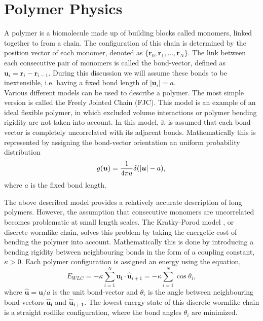 \section{Polymer Physics}
A polymer is a biomolecule made up of building blocks called monomers, linked together to
from a chain. The configuration of this chain is determined by the position vector of
each monomer, denoted as $\{\boldsymbol{r}_0, \boldsymbol{r}_1, \dots,
\boldsymbol{r}_N\}$.  The link between each consecutive pair of monomers is called the
bond-vector, defined as
$\boldsymbol{u}_i = \boldsymbol{r}_i - \boldsymbol{r}_{i-1}$. During this discussion we
will assume these bonds to be inextensible, i.e. having a fixed
bond length of $|\boldsymbol{u}_i| = a$.\\

Various different models can be used to describe a polymer. The most simple version is
called
the Freely Jointed Chain (FJC). This model is an example of an ideal flexible polymer, in
which excluded volume interactions or polymer bending rigidity are not taken into
account.  In this
model, it is assumed that each bond-vector is completely uncorrelated with its adjacent
bonds. Mathematically this is represented by assigning the bond-vector orientation
an uniform probability distribution
\begin{equation}
    g(\boldsymbol{u}) = \frac{1}{4 \pi a}
    \delta(|\boldsymbol{u}| - a), \\
\end{equation}
where $a$ is the fixed bond length.

The above described model provides a relatively accurate description of long polymers.
However, the assumption that consecutive monomers are uncorrelated becomes
problematic at small length scales. The Kratky-Porod model \cite{Kratky1949}, or discrete
wormlike chain,
solves this problem by taking the energetic cost of bending the polymer into
account. Mathematically this is done by introducing a bending rigidity between
neighbouring bonds in the form of a coupling constant, $\kappa >0$. Each polymer
configuration is assigned an energy using the equation,
\begin{equation}
    E_{WLC}= -\kappa \sum_{i=1}^{N} \boldsymbol{\hat{u}_i} \cdot
    \boldsymbol{\hat{u}}_{i+1}
    = -\kappa
    \sum_{i=1}^{N} \cos\theta_i,
    \label{wlc}
\end{equation}
where $\boldsymbol{\hat{u}} = \boldsymbol{u}/a$ is the unit bond-vector and $\theta_i$ is
the angle between neighbouring bond-vectors $\boldsymbol{\hat{u}_i}$ and
$\boldsymbol{\hat{u}_{i+1}}$. The lowest energy state of this discrete wormlike chain is
a straight rodlike configuration, where the bond angles $\theta_i$ are minimized.

